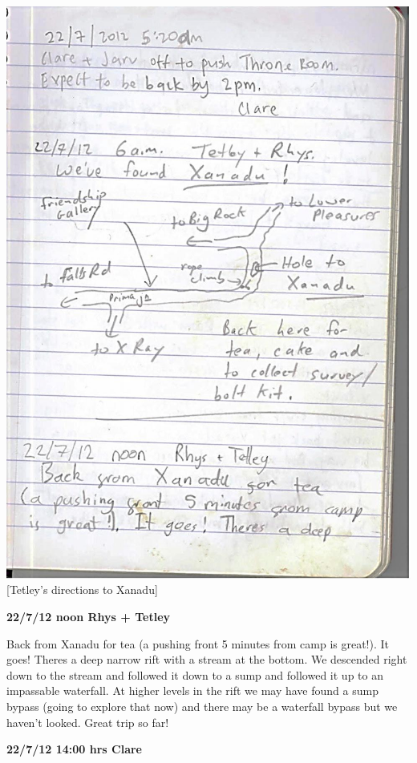 \includegraphics{UgLog1012/67.jpeg}\\
{[}Tetley's directions to Xanadu{]}

\textbf{22/7/12 noon Rhys + Tetley}

Back from Xanadu for tea (a pushing front 5 minutes from camp is
great!). It goes! Theres a deep narrow rift with a stream at the bottom.
We descended right down to the stream and followed it down to a sump and
followed it up to an impassable waterfall. At higher levels in the rift
we may have found a sump bypass (going to explore that now) and there
may be a waterfall bypass but we haven't looked. Great trip so far!

\textbf{22/7/12 14:00 hrs Clare}

